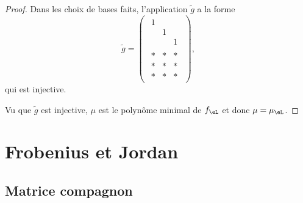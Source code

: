 \begin{proof}
    Dans les choix de bases faits, l'application \( \tilde g\) a la forme
    \begin{equation}
        \tilde g=\begin{pmatrix}
            \begin{matrix}
                1    &       &       \\
                    &   1    &       \\
                    &       &   1
            \end{matrix}\\ 
            \begin{matrix}
                *    &   *    &   *    \\
                *    &   *    &   *    \\
                *    &   *    &   *    
            \end{matrix}
        \end{pmatrix},
    \end{equation}
    qui est injective.

    Vu que \( \tilde g\) est injective, \( \mu\) est le polynôme minimal de \( f_{\eL}\) et donc \( \mu=\mu_{\eL}\).
\end{proof}

\section{Frobenius et Jordan}

\subsection{Matrice compagnon}

